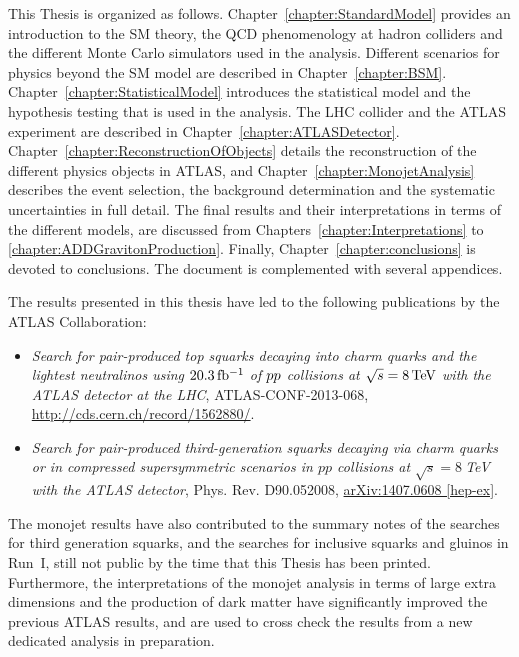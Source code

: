 This Thesis is organized as follows.
Chapter~\ref{chapter:StandardModel} provides an introduction to the SM theory, the QCD phenomenology at hadron colliders and the different Monte Carlo simulators used in the analysis.
Different scenarios for physics beyond the SM model are described in Chapter~\ref{chapter:BSM}.
Chapter~\ref{chapter:StatisticalModel} introduces the statistical model and the hypothesis testing that is used in the analysis.
The LHC collider and the ATLAS experiment are described in Chapter~\ref{chapter:ATLASDetector}.
Chapter~\ref{chapter:ReconstructionOfObjects} details the reconstruction of the different physics objects in ATLAS, and Chapter~\ref{chapter:MonojetAnalysis} describes the event selection, the background determination and the systematic uncertainties in full detail.
The final results and their interpretations in terms of the different models, are discussed from Chapters~\ref{chapter:Interpretations} to \ref{chapter:ADDGravitonProduction}.
Finally, Chapter~\ref{chapter:conclusions} is devoted to conclusions.
The document is complemented with several appendices.

The results presented in this thesis have led to the following publications by the ATLAS Collaboration:

\begin{itemize}
\item \emph{Search for pair-produced top squarks decaying into charm quarks and the lightest neutralinos using $\unit[20.3]{fb^{-1}}$ of $pp$ collisions at $\sqrt{s} = \unit[8]{TeV}$ with the ATLAS detector at the LHC}, ATLAS-CONF-2013-068, \url{http://cds.cern.ch/record/1562880/}.

\item \emph{Search for pair-produced third-generation squarks decaying via charm quarks or in compressed supersymmetric scenarios in $pp$ collisions at $\sqrt{s}=8~$TeV with the ATLAS detector}, Phys. Rev. D90.052008, \href{http://www.arXiv.org/abs/arXiv:1407.0608/}{arXiv:1407.0608 [hep-ex]}.

\end{itemize}

The monojet results have also contributed to the summary notes of the searches for third generation squarks, and the searches for inclusive squarks and gluinos in Run~I, still not public by the time that this Thesis has been printed.
Furthermore, the interpretations of the monojet analysis in terms of large extra dimensions and the production of dark matter have significantly improved the previous ATLAS results, and are used to cross check the results from a new dedicated analysis in preparation.
